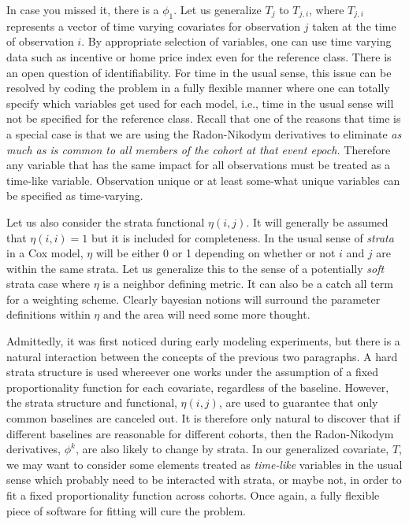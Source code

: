 \documentclass[10pt]{article}
\begin{document}
In case you missed it, there is a $\phi_1$.  Let us generalize $T_j$ to  $T_{j,i}$, where $T_{j,i}$ represents a vector of time varying 
covariates for observation $j$ taken at the time of observation $i$.  By appropriate selection of variables, one can use time varying data such 
as incentive or home price index even for the reference class.  There is 
an open question of identifiability. For time in the usual sense, this issue can be resolved by coding the problem in a fully flexible manner where one 
can totally specify which variables get used for each model, i.e., time in the usual sense will not be specified for the reference class.
Recall that one of the reasons that time is a special case is that we are using the Radon-Nikodym derivatives to eliminate {\em as much as is common 
to all members of the cohort at that event epoch.}  Therefore any variable that has the same impact for all observations must be 
treated as a time-like variable.  Observation unique or at least some-what unique variables can be specified as time-varying.


Let us also consider the strata functional $\eta(i,j)$.  It will generally be assumed that $\eta(i,i)=1$ but it is included for completeness.
In the usual sense of {\em strata} in a Cox model, $\eta$ will be either 0 or 1 depending on whether or not $i$ and $j$ are within the same strata.
Let us generalize this to the sense of a potentially {\em soft} strata case where $\eta$ is a neighbor defining metric.  It can also be a catch all
term for a weighting scheme.  Clearly bayesian notions will surround the parameter definitions within $\eta$ and the area will need some more 
thought.


Admittedly, it was first noticed during early modeling experiments, but there is a natural interaction between the concepts of the previous two
paragraphs.  A hard strata structure is used whereever one works under the assumption of a fixed proportionality function for each covariate, regardless 
of the baseline. However, the strata structure and functional, $\eta(i,j)$, are used to guarantee that only common baselines are canceled out. 
It is therefore only natural to discover that if different baselines are reasonable for different cohorts, then the Radon-Nikodym derivatives,
$\phi^k$, are also likely to change by strata.  In our generalized covariate, $T$, we may want to consider some elements treated as {\em time-like} variables 
in the usual sense which probably need to be interacted with strata, or maybe not, in order to fit a fixed proportionality function across 
cohorts.  Once again, a fully flexible piece of software for fitting will cure the problem.
\end{document}
